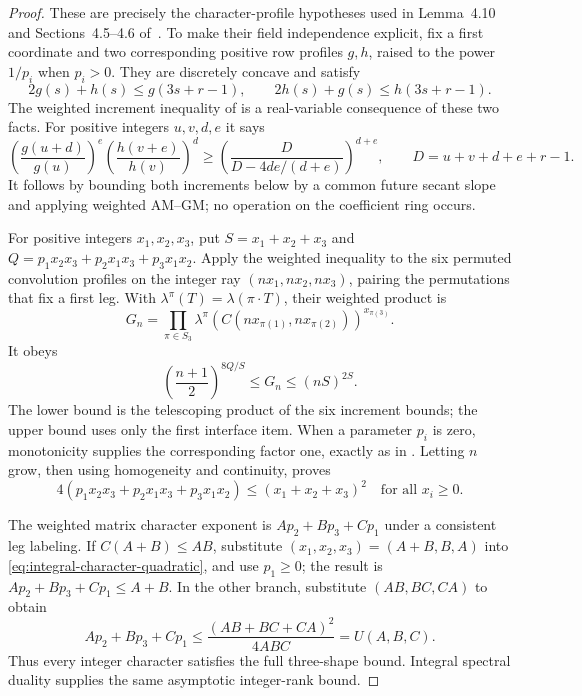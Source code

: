\begin{proof}
These are precisely the character-profile hypotheses used in
Lemma~4.10 and Sections~4.5--4.6 of~\cite{amanov2026}.
To make their field independence explicit, fix a first
coordinate and two corresponding positive row profiles
$g,h$, raised to the power $1/p_i$ when $p_i>0$.
They are discretely concave and satisfy
\[
 2g(s)+h(s)\le g(3s+r-1),\qquad
 2h(s)+g(s)\le h(3s+r-1).
\]
The weighted increment inequality of
\cite[Lemma~4.13]{amanov2026} is a real-variable consequence
of these two facts.  For positive integers $u,v,d,e$ it says
\[
 \left(\frac{g(u+d)}{g(u)}\right)^e
 \left(\frac{h(v+e)}{h(v)}\right)^d
 \ge
 \left(\frac{D}{D-4de/(d+e)}\right)^{d+e},
 \qquad D=u+v+d+e+r-1.
\]
It follows by bounding both increments below by a common
future secant slope and applying weighted AM--GM; no operation
on the coefficient ring occurs.

For positive integers $x_1,x_2,x_3$, put
$S=x_1+x_2+x_3$ and
$Q=p_1x_2x_3+p_2x_1x_3+p_3x_1x_2$.
Apply the weighted inequality to the six permuted convolution
profiles on the integer ray $(nx_1,nx_2,nx_3)$, pairing the
permutations that fix a first leg.  With
$\lambda^\pi(T)=\lambda(\pi\cdot T)$, their weighted product is
\[
 G_n=\prod_{\pi\in S_3}
 \lambda^\pi\!\left(C(nx_{\pi(1)},nx_{\pi(2)})\right)^{x_{\pi(3)}}.
\]
It obeys
\[
 \left(\frac{n+1}{2}\right)^{8Q/S}
       \le G_n\le(nS)^{2S}.
\]
The lower bound is the telescoping product of the six
increment bounds; the upper bound uses only the first
interface item.  When a parameter $p_i$ is zero, monotonicity
supplies the corresponding factor one, exactly as in
\cite[Proposition~4.14]{amanov2026}.
Letting $n$ grow, then using homogeneity and continuity, proves
\begin{equation}\label{eq:integral-character-quadratic}
 4(p_1x_2x_3+p_2x_1x_3+p_3x_1x_2)
       \le(x_1+x_2+x_3)^2
 \quad\text{for all }x_i\ge0.
\end{equation}

The weighted matrix character exponent is
$Ap_2+Bp_3+Cp_1$ under a consistent leg labeling.
If $C(A+B)\le AB$, substitute
$(x_1,x_2,x_3)=(A+B,B,A)$ into
\eqref{eq:integral-character-quadratic}, and use $p_1\ge0$;
the result is $Ap_2+Bp_3+Cp_1\le A+B$.
In the other branch, substitute $(AB,BC,CA)$ to obtain
\[
 Ap_2+Bp_3+Cp_1
       \le\frac{(AB+BC+CA)^2}{4ABC}=U(A,B,C).
\]
Thus every integer character satisfies the full three-shape
bound.  Integral spectral duality supplies the same
asymptotic integer-rank bound.


\end{proof}
